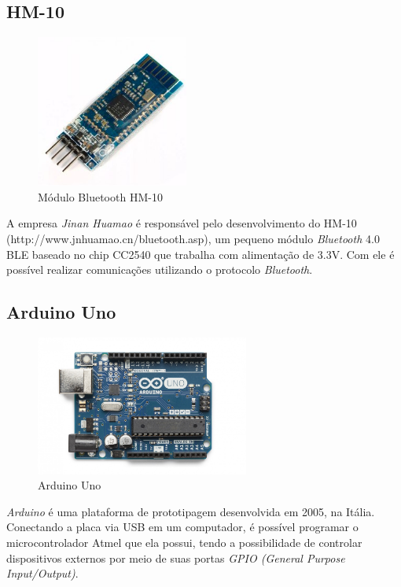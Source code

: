 \documentclass[
	12pt,				%
	oneside,			%
	a4paper,			%
	brazil				%
]{abntex2}
\begin{document}
\subsection{HM-10}

\begin{figure}[!h]
\centering
\includegraphics[width=5cm, center]{images/hm-10}
\caption{Módulo Bluetooth HM-10}
\label{Rotulo}
\end{figure}

A empresa \textit{Jinan Huamao} é responsável pelo desenvolvimento do HM-10 (http://www.jnhuamao.cn/bluetooth.asp), um pequeno módulo \textit{Bluetooth} 4.0 BLE baseado no chip CC2540 que trabalha com alimentação de 3.3V. Com ele é possível realizar comunicações utilizando o protocolo \textit{Bluetooth}.

\newpage

\subsection{Arduino Uno}

\begin{figure}[!h]
\centering
\includegraphics[width=7cm, center]{images/arduino}
\caption{Arduino Uno}
\label{Rotulo}
\end{figure}

\textit{Arduino} é uma plataforma de prototipagem desenvolvida em 2005, na Itália. Conectando a placa via USB em um computador, é possível programar o microcontrolador Atmel que ela possui, tendo a possibilidade de controlar dispositivos externos por meio de suas portas \textit{GPIO (General Purpose Input/Output)}.
\end{document}
